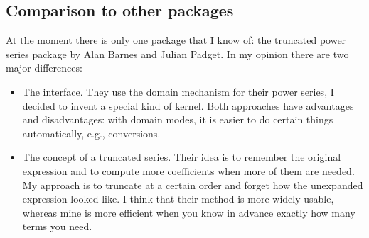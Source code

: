\subsection{Comparison to other packages}

At the moment there is only one \REDUCE{} package that I know of:
the truncated power series package by Alan Barnes and Julian Padget.
In my opinion there are two major differences:
\begin{itemize}
  \item The interface. They use the domain mechanism for their power
        series, I decided to invent a special kind of kernel. Both
        approaches have advantages and disadvantages: with domain
        modes, it is easier
        to do certain things automatically, e.g., conversions.
  \item The concept of a truncated series. Their idea is to remember
        the original expression and to compute more coefficients when
        more of them are needed. My approach is to truncate at a
        certain order and forget how the unexpanded expression
        looked like.  I think that their method is more widely
        usable, whereas mine is more efficient when you know in
        advance exactly how many terms you need.
\end{itemize}

